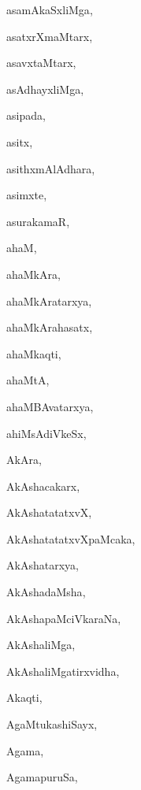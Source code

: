 \begin{multicols}{3}
{\noindent
{asamAkaSxliMga}, \pageref{asamAkaSxliMga}

\noindent
{asatxrXmaMtarx}, \pageref{asatxrXmaMtarx}

\noindent
{asavxtaMtarx}, \pageref{asavxtaMtarx}

\noindent
{asAdhayxliMga}, \pageref{asAdhayxliMga}

\noindent
{asipada}, \pageref{asipada}

\noindent
{asitx}, \pageref{asitx}

\noindent
{asithxmAlAdhara}, \pageref{asithxmAlAdhara}

\noindent
{asimxte}, \pageref{asimxte}

\noindent
{asurakamaR}, \pageref{asurakamaR}

\noindent
{ahaM}, \pageref{ahaM}

\noindent
{ahaMkAra}, \pageref{ahaMkAra}

\noindent
{ahaMkAratarxya}, \pageref{ahaMkAratarxya}

\noindent
{ahaMkArahasatx}, \pageref{ahaMkArahasatx}

\noindent
{ahaMkaqti}, \pageref{ahaMkaqti}

\noindent
{ahaMtA}, \pageref{ahaMtA}

\noindent
{ahaMBAvatarxya}, \pageref{ahaMBAvatarxya}

\noindent
{ahiMsAdiVkeSx}, \pageref{ahiMsAdiVkeSx}

\noindent
{AkAra}, \pageref{AkAra}

\noindent
{AkAshacakarx}, \pageref{AkAshacakarx}

\noindent
{AkAshatatatxvX}, \pageref{AkAshatatatxvX}

\noindent
{AkAshatatatxvXpaMcaka}, \pageref{AkAshatatatxvXpaMcaka}

\noindent
{AkAshatarxya}, \pageref{AkAshatarxya}

\noindent
{AkAshadaMsha}, \pageref{AkAshadaMsha}

\noindent
{AkAshapaMciVkaraNa}, \pageref{AkAshapaMciVkaraNa}

\noindent
{AkAshaliMga}, \pageref{AkAshaliMga}

\noindent
{AkAshaliMgatirxvidha}, \pageref{AkAshaliMgatirxvidha}

\noindent
{Akaqti}, \pageref{Akaqti}

\noindent
{AgaMtukashiSayx}, \pageref{AgaMtukashiSayx}

\noindent
{Agama}, \pageref{Agama}

\noindent
{AgamapuruSa}, \pageref{AgamapuruSa}

}
\end{multicols}

